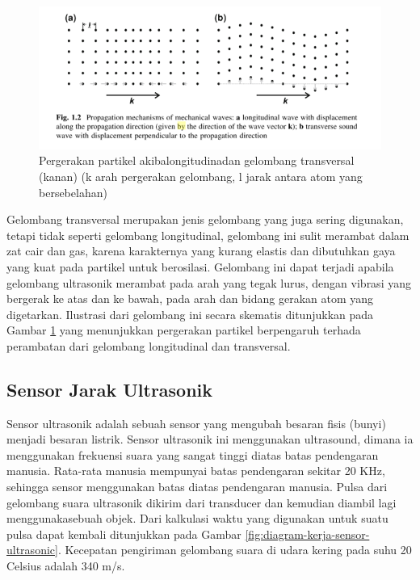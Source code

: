\begin{figure}[h!]
	\centering
	\includegraphics[width=\linewidth]{"gambar/pergerakan partikel"}
	\caption{Pergerakan partikel akibalongitudinadan gelombang transversal (kanan) (k arah pergerakan gelombang, l jarak 
  antara atom yang bersebelahan) \parencite{still2010high}}
	\label{fig:pergerakan-partikel}
\end{figure}

Gelombang transversal merupakan jenis gelombang yang juga sering digunakan, tetapi tidak seperti gelombang longitudinal, gelombang ini sulit 
merambat dalam zat cair dan gas, karena karakternya yang kurang elastis dan dibutuhkan gaya yang kuat pada partikel untuk berosilasi. Gelombang 
ini dapat terjadi apabila gelombang ultrasonik merambat pada arah yang tegak lurus, dengan vibrasi yang bergerak ke atas dan ke bawah, pada arah 
dan bidang gerakan atom yang digetarkan. Ilustrasi dari gelombang ini secara skematis ditunjukkan pada Gambar \ref{fig:pergerakan-partikel} yang 
menunjukkan pergerakan partikel berpengaruh terhada perambatan dari gelombang longitudinal dan transversal.

\subsection{Sensor Jarak Ultrasonik}

Sensor ultrasonik adalah sebuah sensor yang mengubah besaran fisis (bunyi) menjadi besaran listrik. Sensor ultrasonik ini menggunakan ultrasound, 
dimana ia menggunakan frekuensi suara yang sangat tinggi diatas batas pendengaran manusia. Rata-rata manusia mempunyai batas pendengaran sekitar 20 
KHz, sehingga sensor menggunakan batas diatas pendengaran manusia. Pulsa dari gelombang suara ultrasonik dikirim dari transducer dan kemudian diambil 
lagi menggunakasebuah objek. Dari kalkulasi waktu yang digunakan untuk suatu pulsa dapat kembali ditunjukkan 
pada Gambar \ref*{fig:diagram-kerja-sensor-ultrasonic}. Kecepatan pengiriman gelombang suara di udara kering pada suhu 20 Celsius adalah 340 m/s.

